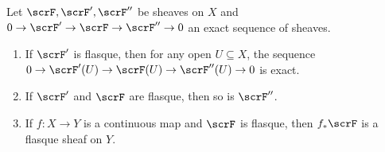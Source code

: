 \begin{theorem}
    Let $\scrF,\scrF',\scrF''$ be sheaves on $X$ and $0\rightarrow\scrF'\rightarrow\scrF\rightarrow\scrF''\rightarrow 0$ an exact sequence of sheaves.
    \begin{enumerate}[label=(\alph*)]
        \item If $\scrF'$ is flasque, then for any open $U\subseteq X$, the sequence $0\rightarrow\scrF'(U)\rightarrow\scrF(U)\rightarrow\scrF''(U)\rightarrow 0$ is exact.
        \item If $\scrF'$ and $\scrF$ are flasque, then so is $\scrF''$.
        \item If $f: X\to Y$ is a continuous map and $\scrF$ is flasque, then $f_\ast\scrF$ is a flasque sheaf on $Y$.
    \end{enumerate}
\end{theorem}
